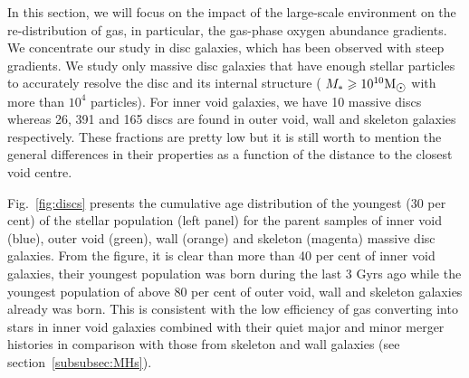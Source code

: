 \documentclass[a4paper,fleqn,usenatbib,letter]{mnras}
\newcommand{\Msun}{\rm M_{\sun}}
\begin{document}
In this section, we will focus on  the impact of the large-scale environment  on the re-distribution of gas, in particular, the gas-phase oxygen abundance gradients. We concentrate our study in disc  galaxies, which has been observed with steep gradients. We study only massive disc galaxies that have enough stellar particles to accurately resolve the disc and its internal structure ( $M_{*}\geq 10^{10}\Msun$ with more than $10^4$ particles).  For inner void galaxies, we have 10 massive discs whereas  26, 391 and  165 discs  are found in outer void, wall and skeleton galaxies respectively. These fractions are pretty low but it is still worth to mention the general differences in their properties as a function of the distance to the closest void centre. 


Fig.~\ref{fig:discs} presents  the cumulative age distribution of the youngest (30 per cent) of the stellar population (left panel) for the parent samples of inner void (blue), outer void (green),  wall (orange) and skeleton (magenta) massive disc galaxies. From the figure, it is clear than more than 40 per cent of inner void galaxies,  their youngest population  was born during the last 3 Gyrs ago while the youngest population of above 80 per cent of outer void, wall and skeleton galaxies already was born. This is consistent with the  low efficiency of gas converting into stars  in inner void galaxies combined with their  quiet major and minor merger histories in comparison with those from skeleton and wall galaxies (see section~\ref{subsubsec:MHs}).  
\end{document}
